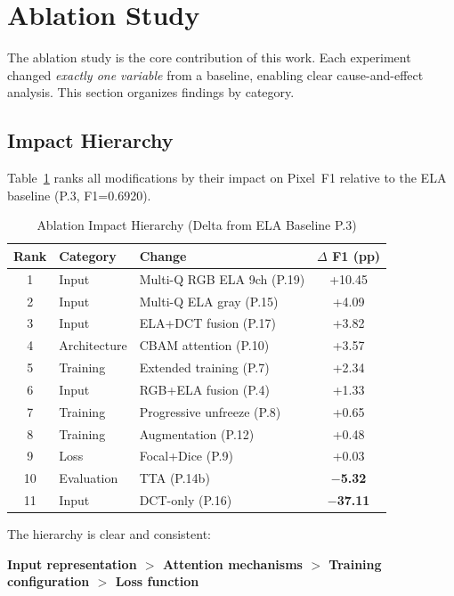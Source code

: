 \documentclass[conference]{IEEEtran}
\begin{document}
\section{Ablation Study}

The ablation study is the core contribution of this work. Each experiment changed \textit{exactly one variable} from a baseline, enabling clear cause-and-effect analysis. This section organizes findings by category.

\subsection{Impact Hierarchy}

Table~\ref{tab:impact} ranks all modifications by their impact on Pixel~F1 relative to the ELA baseline (P.3, F1=0.6920).

\begin{table}[H]
\centering
\caption{Ablation Impact Hierarchy (Delta from ELA Baseline P.3)}
\label{tab:impact}
\begin{tabular}{c l l c}
\toprule
\textbf{Rank} & \textbf{Category} & \textbf{Change} & \textbf{$\Delta$ F1 (pp)} \\
\midrule
1 & Input & Multi-Q RGB ELA 9ch (P.19) & +10.45 \\
2 & Input & Multi-Q ELA gray (P.15) & +4.09 \\
3 & Input & ELA+DCT fusion (P.17) & +3.82 \\
4 & Architecture & CBAM attention (P.10) & +3.57 \\
5 & Training & Extended training (P.7) & +2.34 \\
6 & Input & RGB+ELA fusion (P.4) & +1.33 \\
7 & Training & Progressive unfreeze (P.8) & +0.65 \\
8 & Training & Augmentation (P.12) & +0.48 \\
9 & Loss & Focal+Dice (P.9) & +0.03 \\
10 & Evaluation & TTA (P.14b) & \textbf{$-$5.32} \\
11 & Input & DCT-only (P.16) & \textbf{$-$37.11} \\
\bottomrule
\end{tabular}
\end{table}

The hierarchy is clear and consistent:

\begin{center}
\textbf{Input representation $>$ Attention mechanisms $>$ Training configuration $>$ Loss function}
\end{center}
\end{document}
